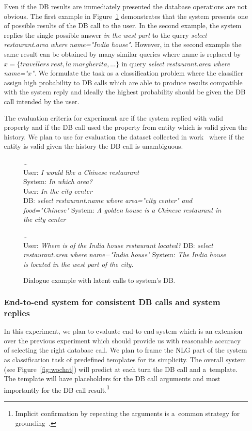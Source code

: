 \documentclass[11pt]{article}
\def\sys#1{{\color{purple}System: \it #1}}
\def\usr#1{{\color{brown}User: \it #1}}
\def\api#1{{\color{green}DB: \it #1}}
\begin{document}
Even if the DB results are immediately presented the database operations are not obvious.  
The first example in Figure~\ref{fig:apicall} demonstrates that the system presents one of possible results of the DB call to the user.
In the second example, the system replies the single possible answer {\it in the west part} to the query {\it select restaurant.area where name="India house"}.
However, in the second example the same result can be obtained by many similar queries where name is replaced by $x=\{travellers\ rest, la\ margherita, \ldots\}$ in query {\it select restaurant.area where name="$x$"}.
We formulate the task as a classification problem where the classifier assign high probability to DB calls which are able to produce results compatible with the system reply and ideally the highest probability should be given the DB call intended by the user.

The evaluation criteria for experiment are if the system replied with valid property and if the DB call used the property from entity which is valid given the history.
We plan to use for evaluation the dataset collected in work~\cite{platek2016wochat} where if the entity is valid given the history the DB call is unambiguous. 

\begin{figure}
    \dots \\
    \usr{I would like a Chinese restaurant} \\
    \sys{In which area?} \\
    \usr{In the city center} \\
    \api{select restaurant.name where area="city center" and food="Chinese"}
    \sys{A golden house is a Chinese restaurant in the city center} 

    \dots \\
    \usr{Where is of the India house restaurant located?}
    \api{select restaurant.area where name="India house"}
    \sys{The India house is located in the west part of the city.}
    \caption{Dialogue example with latent calls to system's DB.}
    \label{fig:apicall}
\end{figure}


\subsubsection*{End-to-end system for consistent DB calls and system replies}
In this experiment, we plan to evaluate end-to-end system which is an extension over the previous experiment which should provide us with reasonable accuracy of selecting the right database call.
We plan to frame the NLG part of the system as classification task of predefined templates for its simplicity.
The overall system (see Figure~\ref{fig:wochat}) will predict at each turn the DB call and a~template.
The template will have placeholders for the DB call arguments and most importantly for the DB call result.\footnote{Implicit confirmation by repeating the arguments is a~common strategy for grounding~\cite{meena_crowdsourcing_2014}.}
\end{document}
